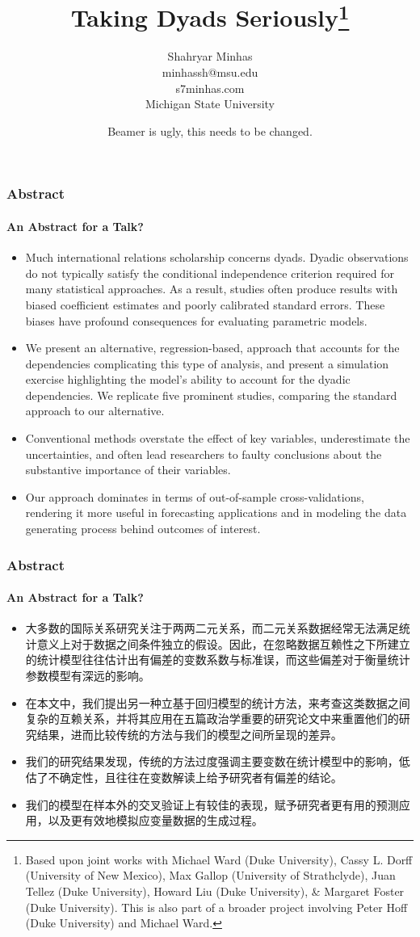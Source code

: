 \documentclass[10pt, compress]{beamer}
\title[AMEN]{Taking Dyads Seriously\thanks{Based upon joint works with Michael Ward (Duke University), Cassy L. Dorff (University of New Mexico), Max Gallop (University of Strathclyde), Juan Tellez (Duke University), Howard Liu (Duke University), \& Margaret Foster (Duke University). This is also part of a broader project involving Peter Hoff (Duke University) and Michael Ward.}
}
\author 
{Shahryar Minhas\\ minhassh@msu.edu \\ s7minhas.com \\
Michigan State University}
\date{Beamer is ugly, this needs to be changed.}
\begin{document}
\frame{\titlepage}


\begin{frame}
\frametitle{Abstract}
\framesubtitle{An Abstract for a Talk?}
\begin{itemize}
\item Much international relations scholarship concerns dyads. Dyadic observations do not typically satisfy the conditional independence criterion required for many statistical approaches. As a result, studies often produce results with biased coefficient estimates and poorly calibrated standard errors. These biases have profound consequences for evaluating parametric models. 

\item We present an alternative, regression-based, approach that accounts for the dependencies complicating this type of analysis, and present a simulation exercise highlighting the model's ability to account for the dyadic dependencies. We replicate five prominent studies, comparing the standard approach to our alternative. 

\item Conventional methods overstate the effect of key variables, underestimate the uncertainties, and often lead researchers to faulty conclusions about the substantive importance of their variables. 

\item Our approach dominates in terms of out-of-sample cross-validations, rendering it more useful in forecasting applications and in modeling the data generating process behind outcomes of interest.
\end{itemize}
\end{frame}

\begin{frame}
\frametitle{Abstract}
\framesubtitle{An Abstract for a Talk?}
\begin{itemize}
\item 大多数的国际关系研究关注于两两二元关系，而二元关系数据经常无法满足统计意义上对于数据之间条件独立的假设。因此，在忽略数据互赖性之下所建立的统计模型往往估计出有偏差的变数系数与标准误，而这些偏差对于衡量统计参数模型有深远的影响。 

\item 在本文中，我们提出另一种立基于回归模型的统计方法，来考查这类数据之间复杂的互赖关系，并将其应用在五篇政治学重要的研究论文中来重置他们的研究结果，进而比较传统的方法与我们的模型之间所呈现的差异。 

\item 我们的研究结果发现，传统的方法过度强调主要变数在统计模型中的影响，低估了不确定性，且往往在变数解读上给予研究者有偏差的结论。

\item 我们的模型在样本外的交叉验证上有较佳的表现，赋予研究者更有用的预测应用，以及更有效地模拟应变量数据的生成过程。
\end{itemize}
\end{frame}
\end{document}
